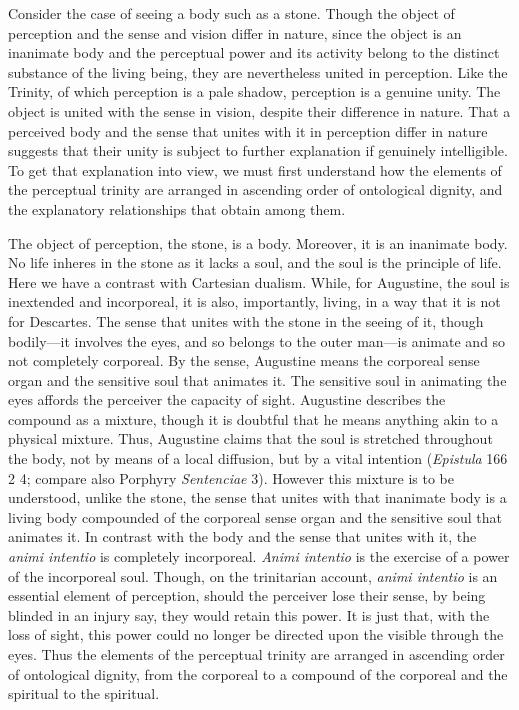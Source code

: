 \documentclass[12pt]{article}
\begin{document}
Consider the case of seeing a body such as a stone. Though the object of perception and the sense and vision differ in nature, since the object is an inanimate body and the perceptual power and its activity belong to the distinct substance of the living being, they are nevertheless united in perception. Like the Trinity, of which perception is a pale shadow, perception is a genuine unity. The object is united with the sense in vision, despite their difference in nature. That a perceived body and the sense that unites with it in perception differ in nature suggests that their unity is subject to further explanation if genuinely intelligible. To get that explanation into view, we must first understand how the elements of the perceptual trinity are arranged in ascending order of ontological dignity, and the explanatory relationships that obtain among them.

The object of perception, the stone, is a body. Moreover, it is an inanimate body. No life inheres in the stone as it lacks a soul, and the soul is the principle of life. Here we have a contrast with Cartesian dualism. While, for Augustine, the soul is inextended and incorporeal, it is also, importantly, living, in a way that it is not for Descartes. The sense that unites with the stone in the seeing of it, though bodily---it involves the eyes, and so belongs to the outer man---is animate and so not completely corporeal. By the sense, Augustine means the corporeal sense organ and the sensitive soul that animates it. The sensitive soul in animating the eyes affords the perceiver the capacity of sight. Augustine describes the compound as a mixture, though it is doubtful that he means anything akin to a physical mixture. Thus, Augustine claims that the soul is stretched throughout the body, not by means of a local diffusion, but by a vital intention (\emph{Epistula} 166 2 4; compare also Porphyry \emph{Sentenciae} 3). However this mixture is to be understood, unlike the stone, the sense that unites with that inanimate body is a living body compounded of the corporeal sense organ and the sensitive soul that animates it. In contrast with the body and the sense that unites with it, the \emph{animi intentio} is completely incorporeal. \emph{Animi intentio} is the exercise of a power of the incorporeal soul. Though, on the trinitarian account, \emph{animi intentio} is an essential element of perception, should the perceiver lose their sense, by being blinded in an injury say, they would retain this power. It is just that, with the loss of sight, this power could no longer be directed upon the visible through the eyes. Thus the elements of the perceptual trinity are arranged in ascending order of ontological dignity, from the corporeal to a compound of the corporeal and the spiritual to the spiritual.
\end{document}
